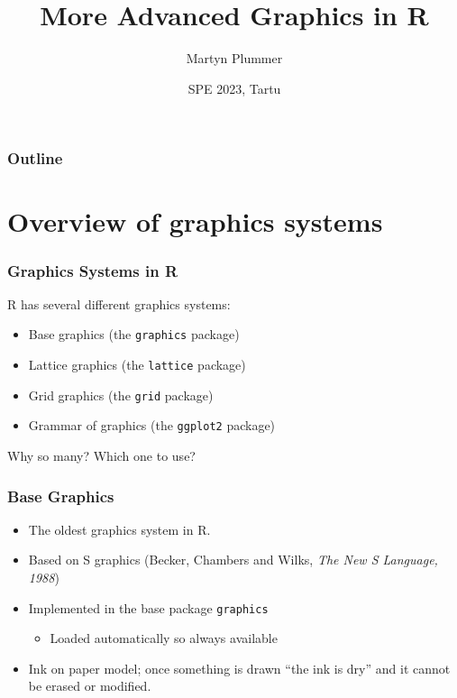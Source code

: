 \documentclass[xcolor=svgnames]{beamer}
\title{More Advanced Graphics in R}
\author[Martyn Plummer]
{Martyn Plummer}
\institute[IARC] %
{
    University of Warwick, UK
}
\date[SPE 2023] %
{SPE 2023, Tartu}
\newcommand{\code}[1]{\texttt{#1}}
\begin{document}
\begin{frame}[plain]
  \titlepage
\end{frame}

\begin{frame}
  \frametitle{Outline}
  \tableofcontents
\end{frame}

\section{Overview of graphics systems}

\begin{frame}
  \frametitle{Graphics Systems in R}  

  R has several different graphics systems: 
  \begin{itemize}
  \item Base graphics (the \code{graphics} package)
  \item Lattice graphics (the \code{lattice} package)
  \item Grid graphics (the \code{grid} package)
  \item Grammar of graphics (the \code{ggplot2} package)
  \end{itemize}
  Why so many? Which one to use?
  
\end{frame}

\begin{frame}
  \frametitle{Base Graphics}
  \begin{itemize}
  \item The oldest graphics system in R.
  \item Based on S graphics (Becker, Chambers and Wilks, 
    {\em The New S Language, 1988})
  \item Implemented in the base package \code{graphics} 
    \begin{itemize}
    \item Loaded automatically so always available
    \end{itemize}
  \item Ink on paper model; once something is drawn ``the ink is dry'' and it 
    cannot be erased or modified.
  \end{itemize}
\end{frame}
\end{document}
